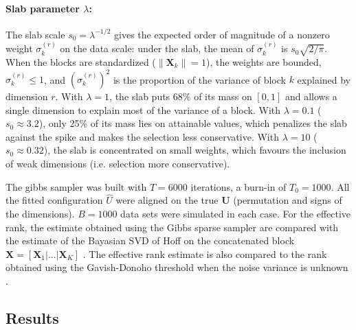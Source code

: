 \documentclass[11pt]{article}
\newcommand{\X}{\mathbf{X}}
\newcommand{\U}{\mathbf{U}}
\begin{document}
\paragraph{Slab parameter $\lambda$:} The slab scale $s_0 = \lambda^{-1/2}$ gives the expected order of magnitude of a nonzero weight $\sigma_k^{(r)}$ on the data scale: under the slab, the mean of $\sigma_k^{(r)}$ is $s_0\sqrt{2/\pi}$. When the blocks are standardized
($\|\mathbf X_k\|=1$), the weights are bounded, $\sigma_k^{(r)}\le 1$, and $(\sigma_k^{(r)})^2$ is the proportion of the variance of block $k$ explained by dimension $r$. With $\lambda=1$, the slab puts 68\% of its mass on $[0,1]$ and allows a single dimension to explain most of the variance of a block. With $\lambda=0.1$ ($s_0\approx 3.2$), only 25\% of its mass lies on attainable
values, which penalizes the slab against the spike and makes the selection less conservative. With $\lambda=10$ ($s_0\approx 0.32$), the slab is concentrated on small weights, which favours the inclusion of weak dimensions (i.e. selection more conservative).

The gibbs sampler was built with $T=6000$ iterations, a burn-in of $T_0=1000$.  All the fitted configuration $\hat U$ were aligned on the true $\U$ (permutation and signs of the dimensions). $B=1000$ data sets were simulated in each case. For the effective rank, the estimate obtained using the Gibbs sparse sampler are compared with the estimate of the Bayasian SVD of Hoff on the concatenated block $\X=[\X_1|...|\X_K]$ \cite[see][for details]{hoff2007}. The effective rank estimate is also compared to the rank obtained using the Gavish-Donoho threshold when the noise variance is unknown \cite[see][for details]{gavish2014}. 

\subsection{Results}
\end{document}
